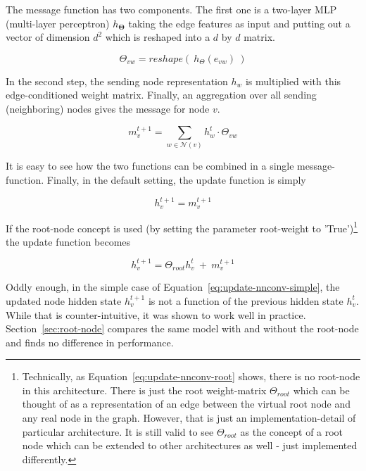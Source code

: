 The message function has two components. The first one is a two-layer MLP (multi-layer perceptron)  $h_{\mathbf{\Theta}}$ taking the edge features as input and putting out a vector of dimension $d^2$ which is reshaped into a $d$ by $d$ matrix.

\begin{equation}
	\Theta_{vw} = reshape(~h_{\Theta}(e_{vw})~)
\end{equation}

In the second step, the sending node representation $h_w$ is multiplied with this edge-conditioned weight matrix. Finally, an aggregation over all sending (neighboring) nodes gives the message for node $v$.

\begin{equation}
 m_v^{t+1} = \sum_{w \in \mathcal{N}(v)} h_w^t \cdot \Theta_{vw}
\end{equation}

It is easy to see how the two functions can be combined in a single message-function. Finally, in the default setting, the update function is simply

\begin{equation}\label{eq:update-nnconv-simple}
	h_v^{t+1} = m_v^{t+1}
\end{equation}

If the root-node concept is used (by setting the parameter root-weight to 'True')\footnote{
	Technically, as Equation~\ref{eq:update-nnconv-root} shows, there is no root-node in this architecture. There is just the root weight-matrix $\Theta_{root}$ which can be thought of as a representation of an edge between the virtual root node and any real node in the graph. However, that is just an implementation-detail of particular architecture. It is still valid to see $\Theta_{root}$ as the concept of a root node which can be extended to other architectures as well - just implemented differently.
} the update function becomes

\begin{equation}\label{eq:update-nnconv-root}
h_v^{t+1} = \Theta_{root}h_v^t~+~m_v^{t+1}
\end{equation}



Oddly enough, in the simple case of Equation~\ref{eq:update-nnconv-simple}, the updated node hidden state $h_v^{t+1}$ is not a function of the previous hidden state $h_v^t$. While that is counter-intuitive, it was shown to work well in practice. Section~\ref{sec:root-node} compares the same model with and without the root-node and finds no difference in performance.


